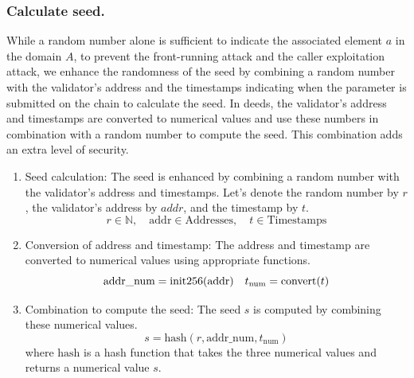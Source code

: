 \documentclass[runningheads]{llncs}
\begin{document}
\subsubsection{Calculate seed.}
While a random number alone is sufficient to indicate the associated element $a$ in the domain $A$, to prevent the front-running attack and the caller exploitation attack, we enhance the randomness of the seed by combining a random number with the validator's address and the timestamps indicating when the parameter is submitted on the chain to calculate the seed. In deeds, the validator's address and timestamps are converted to numerical values and use these numbers in combination with a random number to compute the seed. This combination adds an extra level of security. 
\begin{enumerate}
\item 
Seed calculation: The seed is enhanced by combining a random number with the validator's address and timestamps. Let's denote the random number by $r$, the validator's address by $addr$, and the timestamp by $t$.
\begin{equation}
r \in \mathbb{N}, \quad \text{addr} \in \text{Addresses}, \quad t \in \text{Timestamps}
\end{equation}
\item Conversion of address and timestamp: The address and timestamp are converted to numerical values using appropriate functions.
\begin{equation}
\text{addr\_num} = \text{init256}(\text{addr}) \\
 \quad t_{\text{num}} = \text{convert}(t)
\end{equation}
\item Combination to compute the seed: The seed $s$ is computed by combining these numerical values.
\begin{equation}
s = \text{hash}(r, \text{addr\_num}, t_{\text{num}})
\end{equation}
where \(\text{hash}\) is a hash function that takes the three numerical values and returns a numerical value \( s \).
\end{enumerate}
\end{document}

